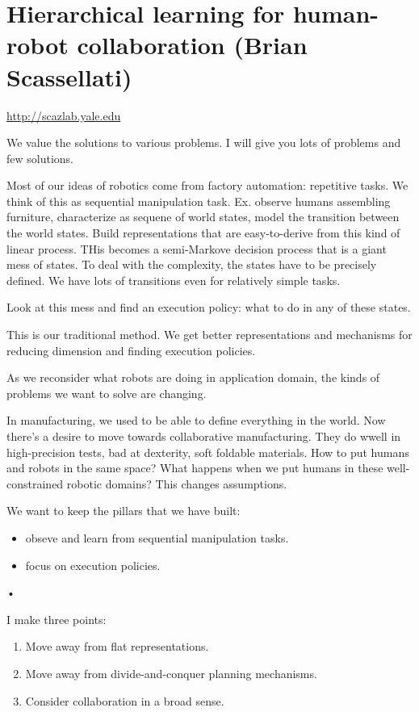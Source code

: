 \section{Hierarchical learning for human-robot collaboration (Brian Scassellati)}

\url{http://scazlab.yale.edu}

We value the solutions to various problems. I will give you lots of problems and few solutions.

Most of our ideas of robotics come from factory automation: repetitive tasks. We think of this as sequential manipulation task. Ex. observe humans assembling furniture, characterize as sequene of world states, model the transition between the world states. Build representations that are easy-to-derive from this kind of linear process. THis becomes a semi-Markove decision process that is a giant mess of states. To deal with the complexity, the states have to be precisely defined. We have lots of transitions even for relatively simple tasks.

Look at this mess and find an execution policy: what to do in any of these states.

This is our traditional method. We get better representations and mechanisms for reducing dimension and finding execution policies.

As we reconsider what robots are doing in application domain, the kinds of problems we want to solve are changing.

In manufacturing, we used to be able to define everything in the world. Now there's a desire to move towards collaborative manufacturing. They do wwell in high-precision tests, bad at dexterity, soft foldable materials. How to put humans and robots in the same space? What happens when we put humans in these well-constrained robotic domains? This changes assumptions.

We want to keep the pillars that we have built:
\begin{itemize}
\item
obseve and learn from sequential manipulation tasks.
\item
focus on execution policies.
\end{itemize}•

I make three points:
\begin{enumerate}
\item
Move away from flat representations.
\item
Move away from divide-and-conquer planning mechanisms.
\item
Consider collaboration in a broad sense.
\end{enumerate}

